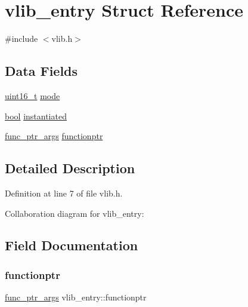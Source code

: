 \hypertarget{a00320}{}\section{vlib\+\_\+entry Struct Reference}
\label{a00320}


{\ttfamily \#include $<$vlib.\+h$>$}

\subsection*{Data Fields}
\begin{DoxyCompactItemize}
\item 
\hyperlink{a00140_a273cf69d639a59973b6019625df33e30_a273cf69d639a59973b6019625df33e30}{uint16\+\_\+t} \hyperlink{a00320_a46df5a47ac05a46ce871e5132153949c_a46df5a47ac05a46ce871e5132153949c}{mode}
\item 
\hyperlink{a00140_af6a258d8f3ee5206d682d799316314b1_af6a258d8f3ee5206d682d799316314b1}{bool} \hyperlink{a00320_ab67e2f60e6622a2d0b7c8a3ac6fd7c71_ab67e2f60e6622a2d0b7c8a3ac6fd7c71}{instantiated}
\item 
\hyperlink{a00140_ab22fa604a9d0187c6a648586ee77944f_ab22fa604a9d0187c6a648586ee77944f}{func\+\_\+ptr\+\_\+args} \hyperlink{a00320_a5d194ce83e680c074ac0a0641af42be6_a5d194ce83e680c074ac0a0641af42be6}{functionptr}
\end{DoxyCompactItemize}


\subsection{Detailed Description}


Definition at line 7 of file vlib.\+h.



Collaboration diagram for vlib\+\_\+entry\+:


\subsection{Field Documentation}
\mbox{\label{a00320_a5d194ce83e680c074ac0a0641af42be6_a5d194ce83e680c074ac0a0641af42be6}} 
\subsubsection{\texorpdfstring{functionptr}{functionptr}}
{\footnotesize\ttfamily \hyperlink{a00140_ab22fa604a9d0187c6a648586ee77944f_ab22fa604a9d0187c6a648586ee77944f}{func\+\_\+ptr\+\_\+args} vlib\+\_\+entry\+::functionptr}



